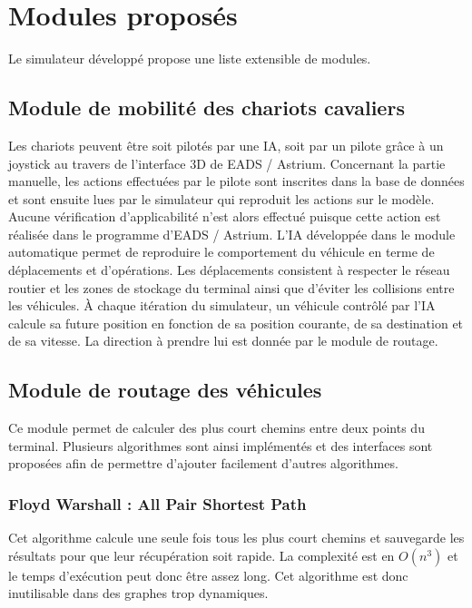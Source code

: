 \FloatBarrier


\section{Modules proposés}

Le simulateur développé propose une liste extensible de modules.

\subsection{Module de mobilité des chariots cavaliers}

Les chariots peuvent être soit pilotés par une IA, soit par un pilote grâce à un joystick au travers de l'interface 3D de EADS / Astrium. Concernant la partie manuelle, les actions effectuées par le pilote sont inscrites dans la base de données et sont ensuite lues par le simulateur qui reproduit les actions sur le modèle. Aucune vérification d'applicabilité n'est alors effectué puisque cette action est réalisée dans le programme d'EADS / Astrium.
L'IA développée dans le module automatique permet de reproduire le comportement du véhicule en terme de déplacements et d'opérations. Les déplacements consistent à respecter le réseau routier et les zones de stockage du terminal ainsi que d'éviter les collisions entre les véhicules. À chaque itération du simulateur, un véhicule contrôlé par l'IA calcule sa future position en fonction de sa position courante, de sa destination et de sa vitesse. La direction à prendre lui est donnée par le module de routage.

\subsection{Module de routage des véhicules}

Ce module permet de calculer des plus court chemins entre deux points du terminal. Plusieurs algorithmes sont ainsi implémentés et des interfaces sont proposées afin de permettre d'ajouter facilement d'autres algorithmes.

\subsubsection{Floyd Warshall : All Pair Shortest Path}

Cet algorithme calcule une seule fois tous les plus court chemins et sauvegarde les résultats pour que leur récupération soit rapide. La complexité est en $O(n^ 3)$ et le temps d'exécution peut donc être assez long.
Cet algorithme est donc inutilisable dans des graphes trop dynamiques.


